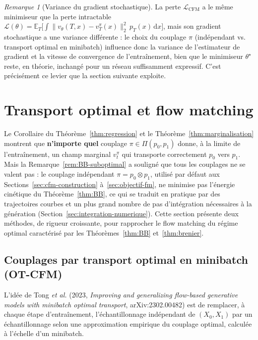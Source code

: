\documentclass[11pt,a4paper]{article}
\theoremstyle{definition}
\theoremstyle{plain}
\theoremstyle{remark}
\newtheorem{remark}{Remarque}[section]
\newcommand{\E}{\mathbb{E}}
\newcommand{\dd}{\,\mathrm{d}}
\begin{document}
\begin{remark}[Variance du gradient stochastique]\label{rem:variance-gradient}
La perte $\mathcal{L}_{\mathrm{CFM}}$ a le même minimiseur que la perte
\og intractable \fg{}
$\mathcal{L}(\theta)=\E_T\bigl[\int\|v_\theta(T,x)-v_T^\pi(x)\|_2^2\,p_T(x)\dd x\bigr]$,
mais son gradient stochastique a une variance différente : le choix du couplage
$\pi$ (indépendant vs. transport optimal en minibatch) influence donc la
variance de l'estimateur de gradient et la vitesse de convergence de
l'entraînement, bien que le minimiseur $\theta^\star$ reste, en théorie,
inchangé pour un réseau suffisamment expressif. C'est précisément ce levier que
la section suivante exploite.
\end{remark}

\section{Transport optimal et flow matching}\label{sec:ot-flow-matching}

Le Corollaire du Théorème~\ref{thm:regression} et le Théorème~\ref{thm:marginalisation}
montrent que \textbf{n'importe quel} couplage $\pi\in\Pi(p_0,p_1)$ donne, à la
limite de l'entraînement, un champ marginal $v_t^\pi$ qui transporte
correctement $p_0$ vers $p_1$. Mais la Remarque~\ref{rem:BB-suboptimal} a
souligné que tous les couplages ne se valent pas : le couplage indépendant
$\pi=p_0\otimes p_1$, utilisé par défaut aux Sections~\ref{sec:cfm-construction}
à~\ref{sec:objectif-fm}, ne minimise pas l'énergie cinétique du Théorème~\ref{thm:BB}, ce qui se
traduit en pratique par des trajectoires courbes et un plus grand nombre de pas
d'intégration nécessaires à la génération (Section~\ref{sec:integration-numerique}). Cette section présente
deux méthodes, de rigueur croissante, pour rapprocher le flow matching du
régime optimal caractérisé par les Théorèmes~\ref{thm:BB} et~\ref{thm:brenier}.

\subsection{Couplages par transport optimal en minibatch (OT-CFM)}

L'idée de Tong \emph{et al.} (2023, \emph{Improving and generalizing
flow-based generative models with minibatch optimal transport},
arXiv:2302.00482) est de remplacer, à chaque étape d'entraînement, l'échantillonnage
indépendant de $(X_0,X_1)$ par un échantillonnage selon une approximation
empirique du couplage optimal, calculée à l'échelle d'un minibatch.
\end{document}
